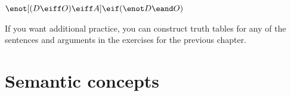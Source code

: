 \begin{compactlist}
%	


\item	$\enot [(D \eiff O) \eiff A] \eif (\enot D \eand O) $

\end{compactlist}


If you want additional practice, you can construct truth tables for any of the sentences and arguments in the exercises for the previous chapter.


\chapter{Semantic concepts}
\label{s:SemanticConcepts}

